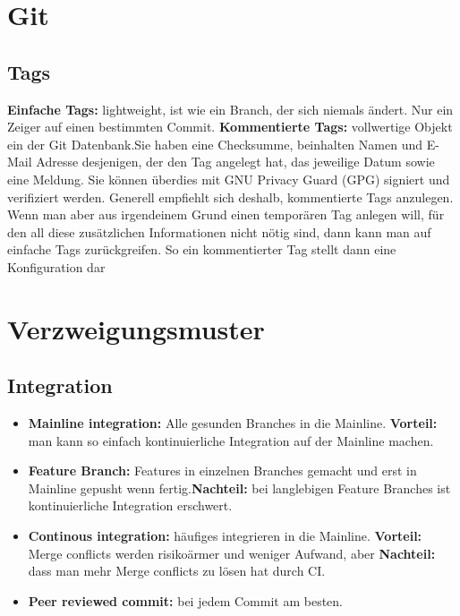 \documentclass{book}
\begin{document}
    \section{Git}
    \subsection{Tags}
    \textbf{Einfache Tags:} lightweight, ist wie ein Branch, der sich niemals ändert. Nur ein Zeiger auf einen bestimmten Commit.
    \newline
    \textbf{Kommentierte Tags:} vollwertige Objekt ein der Git Datenbank.Sie haben eine Checksumme, beinhalten Namen und E-Mail Adresse desjenigen, der den Tag
    angelegt hat, das jeweilige Datum sowie eine Meldung.
    \newline Sie können überdies mit GNU Privacy Guard (GPG)
    signiert und verifiziert werden. Generell empfiehlt sich deshalb, kommentierte Tags anzulegen. Wenn man aber
    aus irgendeinem Grund einen temporären Tag anlegen will, für den all diese zusätzlichen Informationen nicht
    nötig sind, dann kann man auf einfache Tags zurückgreifen.
    So ein kommentierter Tag stellt dann eine Konfiguration dar
    \section{Verzweigungsmuster}
    \subsection{Integration}
    \begin{itemize}
        \item \textbf{Mainline integration:} Alle gesunden Branches in die Mainline.
        \newline \textbf{Vorteil:} man kann so einfach kontinuierliche Integration auf der Mainline machen.
        \item \textbf{Feature Branch:} Features in einzelnen Branches gemacht und erst in Mainline gepusht wenn fertig.\newline  \textbf{Nachteil:} bei langlebigen Feature Branches ist  kontinuierliche Integration erschwert.
        \item \textbf{Continous integration:} häufiges integrieren in die Mainline. \newline \textbf{Vorteil:} Merge conflicts werden risikoärmer und weniger Aufwand, aber
        \newline \textbf{Nachteil:} dass man mehr Merge conflicts zu lösen hat durch CI.
        \item \textbf{Peer reviewed commit:} bei jedem Commit  am besten.
    \end{itemize}
\end{document}
